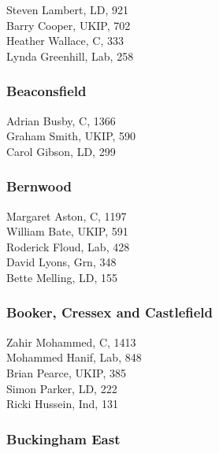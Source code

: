 \documentclass[a4paper,openany,10pt]{book}
\begin{document}


Steven Lambert, LD, 921\\
Barry Cooper, UKIP, 702\\
Heather Wallace, C, 333\\
Lynda Greenhill, Lab, 258\\


\subsubsection*{Beaconsfield}



Adrian Busby, C, 1366\\
Graham Smith, UKIP, 590\\
Carol Gibson, LD, 299\\


\subsubsection*{Bernwood}



Margaret Aston, C, 1197\\
William Bate, UKIP, 591\\
Roderick Floud, Lab, 428\\
David Lyons, Grn, 348\\
Bette Melling, LD, 155\\


\subsubsection*{Booker, Cressex and Castlefield}



Zahir Mohammed, C, 1413\\
Mohammed Hanif, Lab, 848\\
Brian Pearce, UKIP, 385\\
Simon Parker, LD, 222\\
Ricki Hussein, Ind, 131\\


\subsubsection*{Buckingham East}
\end{document}
